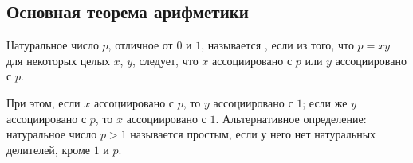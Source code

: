\subsection{Основная теорема арифметики}


\begin{definition}
Натуральное число $p$, отличное от $0$ и $1$, 
называется , если из того, что
$p=xy$ для некоторых целых $x$, $y$,
следует, что $x$ ассоциировано с $p$ или $y$ ассоциировано с $p$.
\end{definition}

При этом, если $x$ ассоциировано с $p$, то $y$ ассоциировано с $1$;
если же $y$ ассоциировано с $p$, то $x$ ассоциировано с $1$.
Альтернативное определение: натуральное число $p>1$ называется
простым, если у него нет натуральных делителей, кроме $1$ и $p$.


